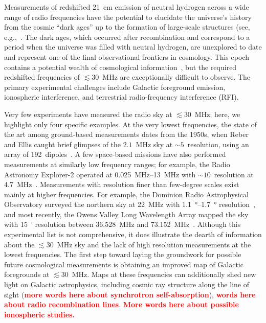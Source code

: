\documentclass{ws-jai}
\newcommand{\attention}[1]{\textcolor{red}{\bf {#1}}}
\begin{document}
Measurements of redshifted \SI{21}{\cm} emission of neutral hydrogen
across a wide range of radio frequencies have the potential to
elucidate the universe's history from the cosmic ``dark ages'' up to
the formation of large-scale structures (see,
e.g.,~\citep{ska_physics,2013PhRvD..87d3002L,2014ApJ...782...66P}.
The dark ages, which occurred after recombination and correspond to a
period when the universe was filled with neutral hydrogen, are
unexplored to date and represent one of the final observational
frontiers in cosmology.  This epoch contains a potential wealth of
cosmological information~\citep{loeb_zaldarriaga, 2019arXiv190710853C,
  2019arXiv190804296K}, but the required redshifted frequencies of
$\lesssim 30$~MHz are exceptionally difficult to observe.  The primary
experimental challenges include Galactic foreground emission,
ionospheric interference, and terrestrial radio-frequency interference
(RFI).

Very few experiments have measured the radio sky at $\lesssim 30$~MHz;
here, we highlight only four specific examples.  At the very lowest
frequencies, the state of the art among ground-based measurements
dates from the 1950s, when Reber and Ellis caught brief glimpses of
the $2.1$~MHz sky at $\sim 5$\degree\ resolution, using an array of
192~dipoles~\citep{reber, article, 1988A&A...195..372W}.  A few
space-based missions have also performed measurements at similarly low
frequency ranges; for example, the Radio Astronomy Explorer-2 operated
at \SIrange{0.025}{13}{\MHz} with $\sim 10$\degree\ resolution at
\SI{4.7}{\MHz}~\citep{1975A&A....40..365A}.  Measurements with
resolution finer than few-degree scales exist mainly at higher
frequencies.  For example, the Dominion Radio Astrophysical
Observatory surveyed the northern sky at \SI{22}{\MHz} with
\SIrange{1.1}{1.7}{\degree} resolution~\citep{1999A&AS..137....7R},
and most recently, the Owens Valley Long Wavelength Array mapped the
sky with \SI{15}{\arcminute} resolution between 36.528~MHz and
73.152~MHz~\citep{2018AJ....156...32E}.  Although this experimental
list is not comprehensive, it does illustrate the dearth of
information about the $\lesssim 30$~MHz sky and the lack of high
resolution measurements at the lowest frequencies.  The first step
toward laying the groundwork for possible future cosmological
measurements is obtaining an improved map of Galactic foregrounds at
$\lesssim 30$~MHz.  Maps at these frequencies can additionally shed
new light on Galactic astrophysics, including cosmic ray structure
along the line of sight (\attention{more words here about synchrotron
  self-absorption}), \attention{words here about radio recombination
  lines}.  \attention{More words here about possible ionospheric
  studies.}
\end{document}
